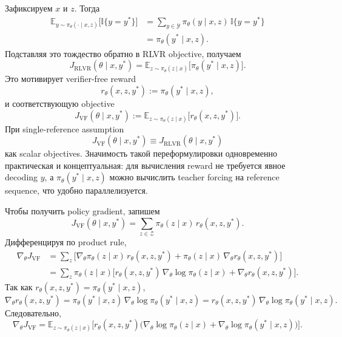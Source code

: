 Зафиксируем \(x\) и \(z\). Тогда
\begin{align*}
    \mathbb{E}_{y\sim\pi_{\theta}(\cdot\mid x,z)}
    \big[\mathbb{I}\{y=y^{*}\}\big]
     & =
    \sum_{y\in\mathcal{Y}}
    \pi_{\theta}(y\mid x,z)\,\mathbb{I}\{y=y^{*}\} \\
     & =
    \pi_{\theta}(y^{*}\mid x,z).
\end{align*}
Подставляя это тождество обратно в RLVR objective, получаем
\[
    J_{\mathrm{RLVR}}(\theta\mid x,y^{*})
    =
    \mathbb{E}_{z\sim\pi_{\theta}(z\mid x)}
    \big[\pi_{\theta}(y^{*}\mid x,z)\big].
\]
Это мотивирует verifier-free reward
\[
    r_{\theta}(x,z,y^{*}) := \pi_{\theta}(y^{*}\mid x,z),
\]
и соответствующую objective
\[
    J_{\mathrm{VF}}(\theta\mid x,y^{*})
    :=
    \mathbb{E}_{z\sim\pi_{\theta}(z\mid x)}
    \big[r_{\theta}(x,z,y^{*})\big].
\]
При single-reference assumption
\[
    J_{\mathrm{VF}}(\theta\mid x,y^{*}) \equiv J_{\mathrm{RLVR}}(\theta\mid x,y^{*})
\]
как scalar objectives. Значимость такой переформулировки одновременно практическая и концептуальная: для вычисления reward не требуется явное decoding \(y\), а \(\pi_{\theta}(y^{*}\mid x,z)\) можно вычислить teacher forcing на reference sequence, что удобно параллелизуется.

Чтобы получить policy gradient, запишем
\[
    J_{\mathrm{VF}}(\theta\mid x,y^{*})
    =
    \sum_{z\in\mathcal{Z}} \pi_{\theta}(z\mid x)\,r_{\theta}(x,z,y^{*}).
\]
Дифференцируя по product rule,
\begin{align*}
    \nabla_{\theta}J_{\mathrm{VF}}
     & =
    \sum_{z}
    \Big[
        \nabla_{\theta}\pi_{\theta}(z\mid x)\,r_{\theta}(x,z,y^{*})
        +
        \pi_{\theta}(z\mid x)\,\nabla_{\theta}r_{\theta}(x,z,y^{*})
    \Big] \\
     & =
    \sum_{z}\pi_{\theta}(z\mid x)
    \Big[
        r_{\theta}(x,z,y^{*})\,\nabla_{\theta}\log\pi_{\theta}(z\mid x)
        +
        \nabla_{\theta}r_{\theta}(x,z,y^{*})
        \Big].
\end{align*}
Так как \(r_{\theta}(x,z,y^{*})=\pi_{\theta}(y^{*}\mid x,z)\),
\[
    \nabla_{\theta}r_{\theta}(x,z,y^{*})
    =
    \pi_{\theta}(y^{*}\mid x,z)\,\nabla_{\theta}\log\pi_{\theta}(y^{*}\mid x,z)
    =
    r_{\theta}(x,z,y^{*})\,\nabla_{\theta}\log\pi_{\theta}(y^{*}\mid x,z).
\]
Следовательно,
\[
    \nabla_{\theta}J_{\mathrm{VF}}
    =
    \mathbb{E}_{z\sim\pi_{\theta}(z\mid x)}\Big[
        r_{\theta}(x,z,y^{*})
        \big(
        \nabla_{\theta}\log\pi_{\theta}(z\mid x)
        +
        \nabla_{\theta}\log\pi_{\theta}(y^{*}\mid x,z)
        \big)
        \Big].
\]

